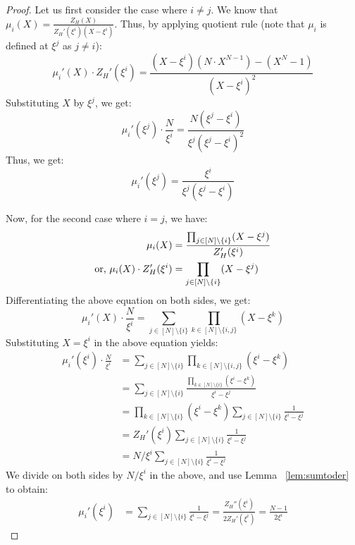 \begin{proof}
    Let us first consider the case where $i \neq j$.
    We know that $\mu_i(X)= \frac{Z_H(X)}{Z_H'(\xi^i)(X-\xi^i)}$.
    Thus, by applying quotient rule (note that $\mu_i$ is defined at $\xi^j$ as $j\neq i$):
    $$\mu_i'(X) \cdot Z_H'(\xi^i)= \frac{(X-\xi^i)(N\cdot X^{N-1})-(X^N-1)}{(X-\xi^i)^2}$$
    Substituting $X$ by $\xi^j$, we get:
    $$\mu_i'(\xi^j) \cdot \frac{N}{\xi^i}= \frac{N(\xi^j-\xi^i)}{\xi^j (\xi^j-\xi^i)^2}$$
    Thus, we get:
    $$\mu_i'(\xi^j)=\frac{\xi^i}{\xi^j(\xi^j-\xi^i)}$$
    
    Now, for the second case where $i=j$, we have:
    \begin{align*}
    \mu_i(X) &= \frac{\prod_{j \in [N] \setminus \{i\}}(X-\xi^j)}{Z_H'(\xi^i)}\\
    \textnormal{or,  }\mu_i(X)\cdot Z_H'(\xi^i) &= \prod_{j \in [N] \setminus \{i\}}(X-\xi^j)\\    
    \end{align*} 
	Differentiating the above equation on both sides, we get:
	\[\mu_i'(X) \cdot \frac{N}{\xi^i} = \sum_{j \in [N] \setminus \{i\}}\prod_{k \in [N]\setminus\{i,j\}}(X-\xi^k)\]  
    Substituting $X=\xi^i$ in the above equation yields:
    \begin{align*}
        \mu_i'(\xi^i) \cdot \frac{N}{\xi^i} &= \sum_{j \in [N] \setminus \{i\}}\prod_{k \in [N]\setminus\{i,j\}}(\xi^i-\xi^k) \\
        &=\sum_{j \in [N] \setminus \{i\}}\frac{\prod_{k \in [N]\setminus\{i\}}(\xi^i-\xi^k)}{\xi^i-\xi^j} \\
        &= \prod_{k \in [N]\setminus\{i\}}(\xi^i-\xi^k)\sum_{j\in [N]\setminus \{i\}}\frac{1}{\xi^i-\xi^j} \\
        &=Z_H'(\xi^i)\sum_{j\in [N]\setminus \{i\}}\frac{1}{\xi^i-\xi^j}\\
        &= N/\xi^i\sum_{j\in [N]\setminus \{i\}}\frac{1}{\xi^i-\xi^j}
    \end{align*}
    We divide on both sides by $N/\xi^i$ in the above, and use Lemma ~\ref{lem:sumtoder} to obtain:
    \begin{align*}
        \mu_i'(\xi^i) &= \sum_{j\in [N]\setminus \{i\}}\frac{1}{\xi^i-\xi^j} =\frac{Z_H''(\xi^i)}{2 Z_H'(\xi^i)}
        =\frac{N-1}{2\xi^i}
    \end{align*}

\end{proof}


